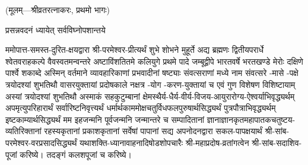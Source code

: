 
\centerline{\small{(मूलम्—श्रीव्रतरत्नाकरः, प्रथमो भागः)}}




{प्रसन्नवदनं ध्यायेत् सर्वविघ्नोपशान्तये}


ममोपात्त-समस्त-दुरित-क्षयद्वारा श्री-परमेश्वर-प्रीत्यर्थं शुभे शोभने मुहूर्ते अद्य ब्रह्मणः
द्वितीयपरार्धे श्वेतवराहकल्पे वैवस्वतमन्वन्तरे अष्टाविंशतितमे कलियुगे प्रथमे पादे
जम्बूद्वीपे भारतवर्षे भरतखण्डे मेरोः दक्षिणे पार्श्वे शकाब्दे अस्मिन् वर्तमाने व्यावहारिकाणां
प्रभवादीनां षष्ट्याः संवत्सराणां मध्ये \blank{} नाम संवत्सरे
\blank{}-मासे \blank{}-पक्षे त्रयोदश्यां शुभतिथौ \blank{} वासरयुक्तायां
प्रदोषकाले \blank{} नक्षत्र \blank{}-योग
\blank{}-करण-युक्तायां च एवं गुण विशेषण विशिष्टायाम्
अस्यां त्रयोदश्यां शुभतिथौ
अस्माकं सहकुटुम्बानां क्षेमस्थैर्य-धैर्य-वीर्य-विजय-आयुरारोग्य-ऐश्वर्याभिवृद्ध्यर्थम्
अपमृत्युपरिहारार्थं सर्वारिष्टनिवृत्त्यर्थं धर्मार्थकाममोक्ष\-चतुर्विधफलपुरुषार्थसिद्ध्यर्थं
पुत्रपौत्राभि\-वृद्ध्यर्थम् इष्टकाम्यार्थसिद्ध्यर्थं
मम इहजन्मनि पूर्वजन्मनि जन्मान्तरे च सम्पादितानां ज्ञानाज्ञानकृतमहा\-पातकचतुष्टय-व्यतिरिक्तानां
रहस्यकृतानां प्रकाशकृतानां सर्वेषां पापानां सद्य अपनोदनद्वारा
सकल-पापक्षयार्थं श्री-सांब-परमेश्वर-वरप्रसादसिद्ध्यर्थं
यथाशक्ति-ध्यानावाहनादिषोडशोपचारैः
श्री-महाप्रदोष-व्रतांगत्वेन श्री-सांब-सदाशिव-पूजां करिष्ये। तदङ्गं कलशपूजां च करिष्ये।





\begingroup
\renewcommand{\devaName}{देव}

\endgroup







